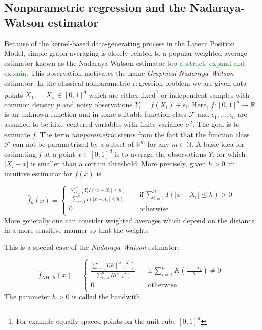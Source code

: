 \documentclass{article}
\newcommand\SB[1]{\textcolor{green}{#1}}
\begin{document}
\subsection{Nonparametric regression and the Nadaraya-Watson estimator}
Because of the kernel-based data-generating process in the Latent Position
Model, simple graph averaging is closely related to a popular weighted average
estimator known as the Nadaraya Watson estimator \SB{too abstract, expand and explain}. This observation motivates the name \textit{Graphical Nadaraya Watson} estimator. In the classical nonparametric regression problem  we are given data points $X_1,...,X_n\in[0,1]^d$ which are either fixed\footnote{For example equally spaced points on the unit cube $[0,1]^d$} or independent samples with common density $p$ and  
noisy observations $Y_i=f(X_i)+\epsilon_i$. Here, $f\colon [0,1]^d\to\mathbb{R}$ is an unknown function and in some suitable function class $\mathcal{F}$ and
$\epsilon_1,...,\epsilon_n$ are assumed to be i.i.d. centered variables with finite variance $\sigma^2$. The goal is to estimate $f$. The term \textit{nonparametric} stems from the fact that the function class $\mathcal{F}$ can not be parametrized by a subset of $\mathbb{R}^m$ for any $m\in \mathbb{N}$.
A basic idea for estimating $f$ at a point $x\in[0,1]^d$ is to average the observations $Y_i$ for which $|X_i-x|$ is smaller than a certain threshold. More precisely, given $h>0$ an intuitive estimator for $f(x)$ is

\begin{equation*}
    \hat{f}_{h}(x)=\begin{cases}
    \frac{\sum_{i=1}^nY_iI(|x-X_i|\leq h)}{\sum_{i=1}^nI(|x-X_i|\leq h)} \quad &\text{if}\, \sum_{i=1}^n 
    I(|x-X_i|\leq h)>0\\
    0 \quad &\text{otherwise}\\
    \end{cases}
\end{equation*}
More generally one can consider weighted averages which depend on the distance in a more sensitive manner so that the weights  

This is a special case of the \textit{Nadaraya Watson} estimator:

\begin{equation}
\label{NW_def}
    \hat{f}_{NW,h}(x)=\begin{cases}
    \frac{\sum_{i=1}^nY_iK(\frac{x-X_i}{h})}{\sum_{i=1}^n{K(\frac{x-X_i}{h}})} \quad &\text{if}\, \sum_{i=1}^n 
    K(\frac{x-X_i}{h})\neq 0\\
    0 \quad &\text{otherwise}\\
    \end{cases}
\end{equation}
The parameter $h>0$ is called the bandwith. 
\end{document}
